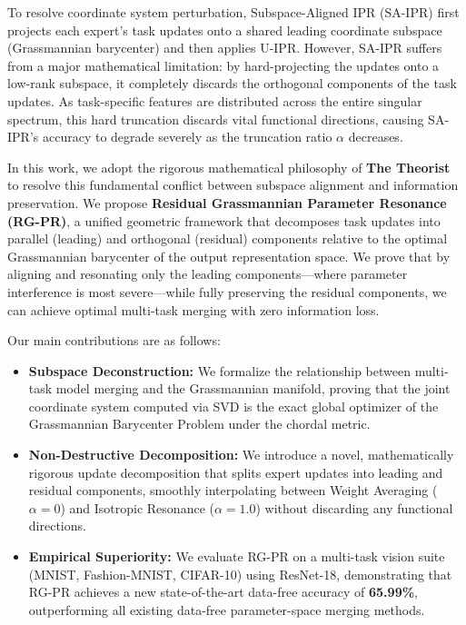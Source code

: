 \documentclass{article}
\theoremstyle{plain}
\theoremstyle{definition}
\theoremstyle{remark}
\begin{document}
To resolve coordinate system perturbation, Subspace-Aligned IPR (SA-IPR) \citep{anonymous2026isotropic} first projects each expert's task updates onto a shared leading coordinate subspace (Grassmannian barycenter) and then applies U-IPR. However, SA-IPR suffers from a major mathematical limitation: by hard-projecting the updates onto a low-rank subspace, it completely discards the orthogonal components of the task updates. As task-specific features are distributed across the entire singular spectrum, this hard truncation discards vital functional directions, causing SA-IPR's accuracy to degrade severely as the truncation ratio $\alpha$ decreases.

In this work, we adopt the rigorous mathematical philosophy of \textbf{The Theorist} to resolve this fundamental conflict between subspace alignment and information preservation. We propose \textbf{Residual Grassmannian Parameter Resonance (RG-PR)}, a unified geometric framework that decomposes task updates into parallel (leading) and orthogonal (residual) components relative to the optimal Grassmannian barycenter of the output representation space. We prove that by aligning and resonating only the leading components---where parameter interference is most severe---while fully preserving the residual components, we can achieve optimal multi-task merging with zero information loss.

Our main contributions are as follows:
\begin{itemize}
    \item \textbf{Subspace Deconstruction:} We formalize the relationship between multi-task model merging and the Grassmannian manifold, proving that the joint coordinate system computed via SVD is the exact global optimizer of the Grassmannian Barycenter Problem under the chordal metric.
    \item \textbf{Non-Destructive Decomposition:} We introduce a novel, mathematically rigorous update decomposition that splits expert updates into leading and residual components, smoothly interpolating between Weight Averaging ($\alpha = 0$) and Isotropic Resonance ($\alpha = 1.0$) without discarding any functional directions.
    \item \textbf{Empirical Superiority:} We evaluate RG-PR on a multi-task vision suite (MNIST, Fashion-MNIST, CIFAR-10) using ResNet-18, demonstrating that RG-PR achieves a new state-of-the-art data-free accuracy of \textbf{65.99\%}, outperforming all existing data-free parameter-space merging methods.
\end{itemize}
\end{document}
